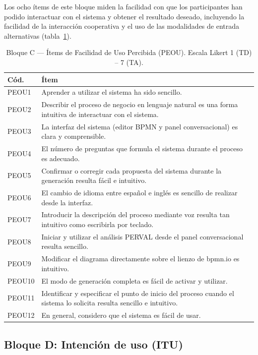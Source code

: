 Los ocho ítems de este bloque miden la facilidad con que los participantes han podido interactuar con el sistema y obtener el resultado deseado, incluyendo la facilidad de la interacción cooperativa y el uso de las modalidades de entrada alternativas (tabla~\ref{tab:peou}).

\begin{table}[H]
\centering
\caption{Bloque C --- Ítems de Facilidad de Uso Percibida (PEOU). Escala Likert 1 (TD) -- 7 (TA).}
\label{tab:peou}
\begin{tabular}{@{} p{1.0cm} @{\hspace{0.8cm}} p{11.8cm} @{}}\hline
\rule{0pt}{10pt}\textbf{Cód.} & \textbf{Ítem} \\
\hline
\rule{0pt}{10pt}PEOU1 & Aprender a utilizar el sistema ha sido sencillo. \\[4pt]
PEOU2 & Describir el proceso de negocio en lenguaje natural es una forma intuitiva de interactuar con el sistema. \\[4pt]
PEOU3 & La interfaz del sistema (editor BPMN y panel conversacional) es clara y comprensible. \\[4pt]
PEOU4 & El número de preguntas que formula el sistema durante el proceso es adecuado. \\[4pt]
PEOU5 & Confirmar o corregir cada propuesta del sistema durante la generación resulta fácil e intuitivo. \\[4pt]
PEOU6 & El cambio de idioma entre español e inglés es sencillo de realizar desde la interfaz. \\[4pt]
PEOU7 & Introducir la descripción del proceso mediante voz resulta tan intuitivo como escribirla por teclado. \\[4pt]
PEOU8 & Iniciar y utilizar el análisis PERVAL desde el panel conversacional resulta sencillo. \\[4pt]
PEOU9 & Modificar el diagrama directamente sobre el lienzo de bpmn.io es intuitivo. \\[4pt]
PEOU10 & El modo de generación completa es fácil de activar y utilizar. \\[4pt]
PEOU11 & Identificar y especificar el punto de inicio del proceso cuando el sistema lo solicita resulta sencillo e intuitivo.\\[4pt] 
PEOU12 & En general, considero que el sistema es fácil de usar. \\[4pt]
\hline
\end{tabular}
\end{table}

\subsection{Bloque D: Intención de uso (ITU)}
\label{subsec:bloqueD}

